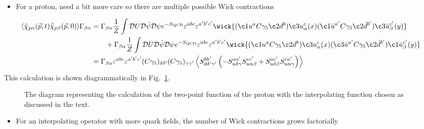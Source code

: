 \begin{itemize}
    \item For a proton, need a bit more care so there are multiple possible Wick contractions
\end{itemize}
\begin{align}
    \langle \tilde{\chi}_{p \alpha}(\vec{p},t) \bar{\tilde{\chi}}_{p \beta}(\vec{p}, 0) \rangle \Gamma_{\beta \alpha} 
    &= \Gamma_{\beta \alpha}\frac{1}{Z}\int \mathcal{D} U \mathcal{D} \bar{\psi}\mathcal{D}\psi e^{-S_{\text{QCD}}}\varepsilon^{abc}\varepsilon^{a' b' c'}\wick{(\c1 {u^a} C \gamma_5 \c2 {d^b})\c3{u^c_\alpha(x)} (\c1 {\bar{u}^{a'}} C \gamma_5 \c2 {\bar{d}^{b'}}) \c3{\bar{u}^{c'}_\beta(y)}} \nonumber \\
    &\qquad+ \Gamma_{\beta \alpha}\frac{1}{Z}\int \mathcal{D} U \mathcal{D} \bar{\psi}\mathcal{D}\psi e^{-S_{\text{QCD}}}\varepsilon^{abc}\varepsilon^{a' b' c'}\wick{(\c1 {u^a} C \gamma_5 \c2 {d^b})\c3{u^c_\alpha(x)} (\c3 {\bar{u}^{a'}} C \gamma_5 \c2 {\bar{d}^{b'}}) \c1{\bar{u}^{c'}_\beta(y)}} \nonumber \\
    &= \Gamma_{\beta \alpha} \varepsilon^{abc} \varepsilon^{a'b'c'}(C \gamma_5)_{\delta \delta'}(C \gamma_5)_{\gamma \gamma'} \left \langle S^{b b'}_{d \delta' \gamma '}\left( - S_{u \delta \gamma}^{a a'} S_{u \alpha \beta}^{c c'} + S_{u \delta \beta}^{a c'} S_{u \alpha \gamma}^{c a'}\right)\right \rangle
\end{align}
This calculation is shown diagrammatically in Fig.~\ref{fig:two_pt_proton}.
\begin{figure}
    \centering
    \caption{The diagram representing the calculation of the two-point function of the proton with the interpolating function chosen as discussed in the text.}
    \label{fig:two_pt_proton}
\end{figure}
\begin{itemize}
    \item For an interpolating operator with more quark fields, the number of Wick contractions grows factorially
\end{itemize}


